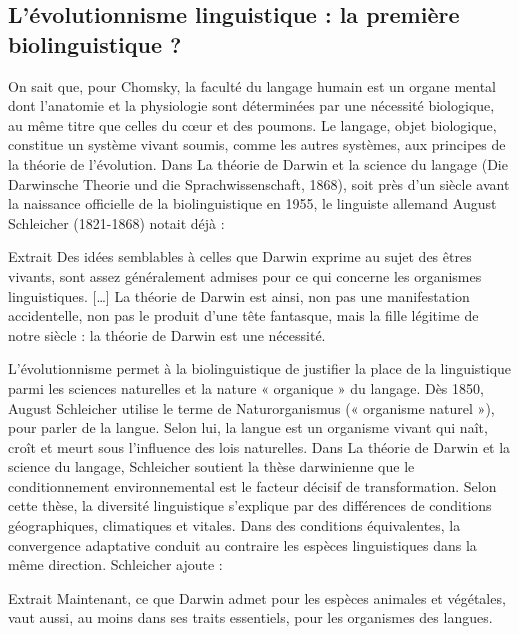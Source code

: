\subsection{L’évolutionnisme linguistique : la première biolinguistique ?}
On sait que, pour Chomsky, la faculté du langage humain est un organe mental dont l'anatomie et
la physiologie sont déterminées par une nécessité biologique, au même titre que celles du cœur et
des poumons. Le langage, objet biologique, constitue un système vivant soumis, comme les autres
systèmes, aux principes de la théorie de l’évolution.
Dans La théorie de Darwin et la science du langage (Die Darwinsche Theorie und die
Sprachwissenschaft, 1868), soit près d'un siècle avant la naissance officielle de la biolinguistique en
1955, le linguiste allemand August Schleicher (1821-1868) notait déjà :
\begin{lecture}{Extrait}
Des idées semblables à celles que Darwin exprime au sujet des êtres vivants, sont assez généralement admises pour ce qui concerne les organismes linguistiques. […] La théorie de Darwin est ainsi, non pas une manifestation accidentelle, non pas le produit d'une tête fantasque, mais la fille légitime de notre siècle : la théorie de Darwin est une nécessité.
\end{lecture}
L'évolutionnisme permet à la biolinguistique de justifier la place de la linguistique parmi les
sciences naturelles et la nature « organique » du langage. Dès 1850, August Schleicher utilise le
terme de Naturorganismus (« organisme naturel »), pour parler de la langue. Selon lui, la langue
est un organisme vivant qui naît, croît et meurt sous l'influence des lois naturelles.
Dans La théorie de Darwin et la science du langage, Schleicher soutient la thèse darwinienne que
le conditionnement environnemental est le facteur décisif de transformation. Selon cette thèse,
la diversité linguistique s'explique par des différences de conditions géographiques, climatiques
et vitales. Dans des conditions équivalentes, la convergence adaptative conduit au contraire les
espèces linguistiques dans la même direction. Schleicher ajoute :

\begin{lecture}{Extrait}
Maintenant, ce que Darwin admet pour les espèces animales et végétales, vaut aussi, au moins dans ses traits essentiels, pour les organismes des langues.
\end{lecture}


